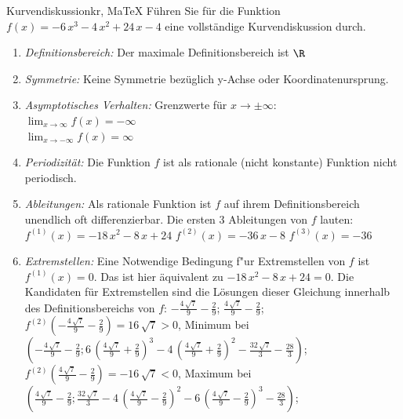  \providecommand{\MoIl}{(} 
 \providecommand{\MoIr}{)}
 \providecommand{\MIntvlSep}{;} 
 \providecommand{\MElSetSep}{;} 
 \begin{MAufgabe}{Kurvendiskussion}{kr, MaTeX}
 F\"uhren Sie f\"ur die Funktion $f(x)= - 6\, x^3 - 4\, x^2 + 24\, x - 4$ eine vollst\"andige Kurvendiskussion durch.\\ 
 \ifLsg\Loesung
 \begin{enumerate}
 \item \emph{Definitionsbereich:} 
 Der maximale Definitionsbereich ist $\R$\item \emph{Symmetrie:} 
 Keine Symmetrie bez\"uglich y-Achse oder Koordinatenursprung.\item \emph{Asymptotisches Verhalten:} 
 Grenzwerte f\"ur $x\rightarrow \pm \infty$: \\ 
 $\lim_{x\rightarrow \infty} f(x)=- \infty$ \\ 
 $\lim_{x\rightarrow -\infty} f(x)=\infty$ \\ 
 \item \emph{Periodizit\"at:} 
 Die Funktion $f$ ist als rationale (nicht konstante) Funktion nicht periodisch.\item \emph{Ableitungen:} 
 Als rationale Funktion ist $f$ auf ihrem Definitionsbereich unendlich oft differenzierbar. 
 Die ersten 3 Ableitungen von $f$ lauten: \\ 
 $f^{(1)}(x)= - 18\, x^2 - 8\, x + 24$\newline 
  $f^{(2)}(x)= - 36\, x - 8$\newline 
  $f^{(3)}(x)=-36$\newline 
  \item \emph{Extremstellen:} 
 Eine Notwendige Bedingung f"ur Extremstellen von $f$ ist $f^{(1)}(x)=0$. 
 Das ist hier \"aquivalent zu $ - 18\, x^2 - 8\, x + 24=0$. 
 Die Kandidaten f\"ur Extremstellen sind die L\"osungen dieser Gleichung innerhalb des Definitionsbereichs von $f$: $ - \frac{4\, \sqrt{7}}{9} - \frac{2}{9}$; $\frac{4\, \sqrt{7}}{9} - \frac{2}{9}$; \\ 
 $f^{(2)}( - \frac{4\, \sqrt{7}}{9} - \frac{2}{9})=16\, \sqrt{7}$$>0$, Minimum bei $( - \frac{4\, \sqrt{7}}{9} - \frac{2}{9};6\, {\left(\frac{4\, \sqrt{7}}{9} + \frac{2}{9}\right)}^3 - 4\, {\left(\frac{4\, \sqrt{7}}{9} + \frac{2}{9}\right)}^2 - \frac{32\, \sqrt{7}}{3} - \frac{28}{3})$; \\ 
 $f^{(2)}(\frac{4\, \sqrt{7}}{9} - \frac{2}{9})=- 16\, \sqrt{7}$$<0$, Maximum bei $(\frac{4\, \sqrt{7}}{9} - \frac{2}{9};\frac{32\, \sqrt{7}}{3} - 4\, {\left(\frac{4\, \sqrt{7}}{9} - \frac{2}{9}\right)}^2 - 6\, {\left(\frac{4\, \sqrt{7}}{9} - \frac{2}{9}\right)}^3 - \frac{28}{3})$; \\ 

\end{enumerate}
\end{MAufgabe}
